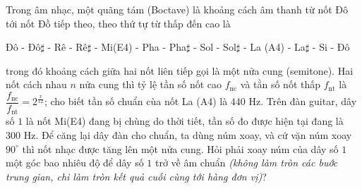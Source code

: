 \begin{ex}%
Trong âm nhạc, một quãng tám (Boctave) là khoảng cách âm thanh từ nốt Đô tới nốt Đồ tiếp theo, theo thứ tự từ thấp đến cao là
\begin{center}
Đô - Đô$\sharp$ - Rê - Rê$\sharp$ - Mi(E4) - Pha - Pha$\sharp$ - Sol - Sol$\sharp$ - La (A4) - La$\sharp$ - Si - Đô
\end{center}
trong đó khoảng cách giữa hai nốt liên tiếp gọi là một nửa cung (semitone). Hai nốt cách nhau $n$ nửa cung thì tỷ lệ tần số nốt cao $f_\text{nc}$ và tằn số nốt thấp $f_\text{nt}$ là $\dfrac{f_\text{nc}}{f_\text{nt}}=2^{\tfrac{x}{12}}$; cho biết tần số chuẩn cùa nốt La (A4) là $440$
Hz. Trên đàn guitar, dây số $1$ là nốt Mi(E4) đang bị chùng do thời tiết, tần số đo được hiện tại đang là $300$
Hz. Để căng lại dây đàn cho chuẩn, ta dùng núm xoay, và cứ vặn núm xoay $90^{\circ}$ thì nốt nhạc được tăng lên một nửa cung. Hỏi phải xoay núm của dây số $1$ một góc bao nhiêu độ để dây số $1$ trở về âm chuẩn \textit{(không làm tròn các buớc trung gian, chi làm tròn kết quả cuối cùng tới hàng đơn vị)}?
\end{ex}
